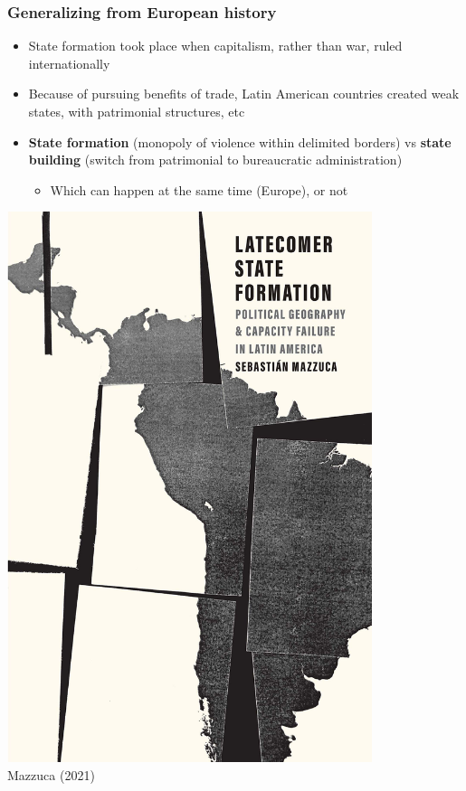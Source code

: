 \documentclass[utf8, xcolor=dvipsnames, handout]{beamer}
\begin{document}
\begin{frame}
\frametitle{Generalizing from European history}
\centering

\begin{minipage}{0.6\textwidth}\centering
  \begin{itemize}[<+->]
    \item State formation took place when capitalism, rather than war, ruled internationally
    \item Because of pursuing benefits of trade, Latin American countries created weak states, with patrimonial structures, etc
    \item \textbf{State formation} (monopoly of violence within delimited borders) vs \textbf{state building} (switch from patrimonial to bureaucratic administration)
    \begin{itemize}
      \item Which can happen at the same time (Europe), or not
    \end{itemize}
  \end{itemize}
\end{minipage}\hfill
\begin{minipage}{0.4\textwidth}\centering
  \includegraphics[width = 0.8\textwidth]{img/mazzuca_book}\\
  {\small Mazzuca (2021)}
\end{minipage}

\end{frame}
\end{document}
